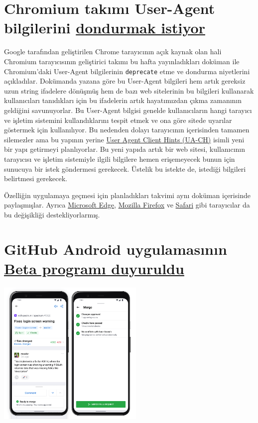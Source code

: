 \documentclass[11pt]{article}
\begin{document}
\section{Chromium takımı User-Agent bilgilerini \href{https://groups.google.com/a/chromium.org/forum/m/\#!msg/blink-dev/-2JIRNMWJ7s/yHe4tQNLCgAJ}{dondurmak istiyor}}
\label{sec:org571efc3}
Google tarafından geliştirilen Chrome tarayıcının açık kaynak olan hali
Chromium tarayıcısının geliştirici takımı bu hafta yayınladıkları doküman ile
Chromium'daki User-Agent bilgilerinin \texttt{deprecate} etme ve dondurma niyetlerini
açıkladılar. Dokümanda yazana göre bu User-Agent bilgileri hem artık gereksiz
uzun string ifadelere dönüşmüş hem de bazı web sitelerinin bu bilgileri
kullanarak kullanıcıları tanıdıkları için bu ifadelerin artık hayatımızdan
çıkma zamanının geldiğini savunuyorlar. Bu User-Agent bilgisi genelde
kullanıcıların hangi tarayıcı ve işletim sistemini kullandıklarını tespit etmek
ve ona göre sitede uyarılar göstermek için kullanılıyor. Bu nedenden dolayı
tarayıcının içerisinden tamamen silemezler ama bu yapının yerine \href{https://wicg.github.io/ua-client-hints/}{User Agent
Client Hints (UA-CH)} isimli yeni bir yapı getirmeyi planlıyorlar. Bu yeni
yapıda artık bir web sitesi, kullanıcının tarayıcısı ve işletim sistemiyle
ilgili bilgilere hemen erişemeyecek bunun için sunucuya bir istek göndermesi
gerekecek. Üstelik bu istekte de, istediği bilgileri belirtmesi gerekecek.

Özelliğin uygulamaya geçmesi için planladıkları takvimi aynı doküman içerisinde
paylaşmışlar. Ayrıca \href{https://twitter.com/\_scottlow/status/1206831008261132289}{Microsoft Edge}, \href{https://github.com/mozilla/standards-positions/issues/202\#issuecomment-558294095}{Mozilla Firefox} ve \href{https://twitter.com/rmondello/status/943545865204989953}{Safari} gibi tarayıcılar
da bu değişikliği destekliyorlarmış.
\section{GitHub Android uygulamasının \href{https://github.blog/2020-01-14-the-github-for-android-beta-is-here/}{Beta programı duyuruldu}}
\label{sec:orgafb96db}
\begin{center}
\includegraphics[height=7cm]{gorseller/github-mobil-android.png}
\end{center}
\end{document}
